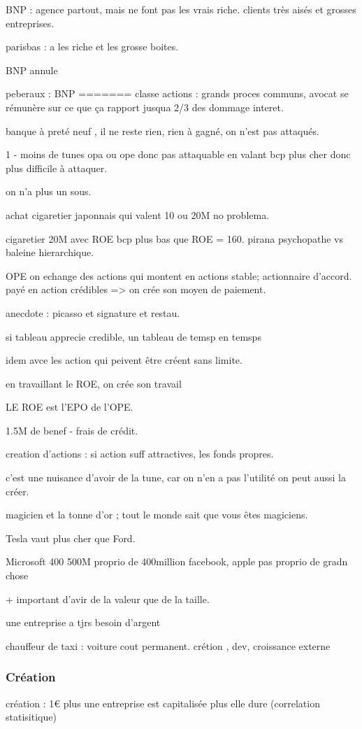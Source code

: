 \documentclass[a4paper,12pt]{article}
\begin{document}
BNP : agence partout, mais ne font pas les vrais riche.
clients très aisés et grosses entreprises.

parisbas : a les riche et les grosse boites.

BNP annule 

peberaux : BNP
=======
classe actions : grands proces communs, avocat se rémunère sur ce que ça rapport jusqua 2/3 des dommage interet.

banque à preté neuf , il ne reste rien, rien à gagné, on n'est pas attaqués.

1 - moins de tunes opa ou ope donc pas attaquable en valant bcp plus cher donc plus difficile à attaquer.

on n'a plus un sous.

achat cigaretier japonnais qui valent 10 ou 20M no problema.

cigaretier 20M avec ROE bcp plus bas que ROE = 160.
pirana psychopathe vs baleine hierarchique.

OPE on echange des actions qui montent en actions stable; actionnaire d'accord.
payé en action crédibles => on crée son moyen de paiement.

anecdote : picasso et signature et restau.

si tableau apprecie credible, un tableau de temsp en temsps

idem avce les action qui peivent être créent sans limite.

en travaillant le ROE, on crée son travail

LE ROE est l'EPO de l'OPE.

1.5M de benef - frais de crédit.

creation d'actions : si action suff attractives, les fonds propres.

c'est une nuisance d'avoir de la tune, car on n'en a pas l'utilité on peut aussi la créer. 

magicien et la tonne d'or ; tout le monde sait que vous êtes magiciens.


Tesla vaut plus cher que Ford.

Microsoft 400 500M proprio de 400million
facebook, apple pas proprio de gradn chose

+ important d'avir de la valeur que de la taille.


une entreprise a tjrs besoin d'argent

chauffeur de taxi : voiture cout permanent. crétion , dev, croissance externe

\subsubsection{Création}
création : 1€  plus une entreprise est capitalisée plus elle dure (correlation statisitique)
\end{document}
